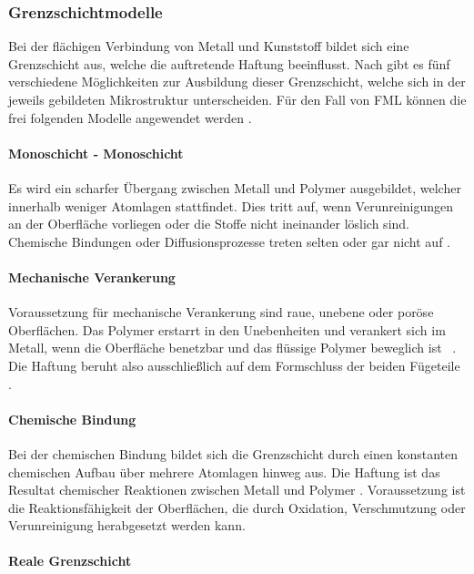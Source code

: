 \subsubsection{Grenzschichtmodelle}\label{sec:modelle}

Bei der flächigen Verbindung von Metall und Kunststoff bildet sich eine Grenzschicht aus, welche die auftretende Haftung beeinflusst.
Nach \cite{Haefer.1987} gibt es fünf verschiedene Möglichkeiten zur Ausbildung dieser Grenzschicht, welche sich in der jeweils gebildeten Mikrostruktur unterscheiden.
Für den Fall von FML können die frei folgenden Modelle angewendet werden \cite{Flock.2012}.

\paragraph{Monoschicht - Monoschicht}

Es wird ein scharfer Übergang zwischen Metall und Polymer ausgebildet, welcher innerhalb weniger Atomlagen stattfindet.
Dies tritt auf, wenn Verunreinigungen an der Oberfläche vorliegen oder die Stoffe nicht ineinander löslich sind.
Chemische Bindungen oder Diffusionsprozesse treten selten oder gar nicht auf \cite{Mann.1993,Haefer.1987}.

\paragraph{Mechanische Verankerung}

Voraussetzung für mechanische Verankerung sind raue, unebene oder poröse Oberflächen.
Das Polymer erstarrt in den Unebenheiten und verankert sich im Metall, wenn die Oberfläche benetzbar und das flüssige Polymer beweglich ist \cite{Haefer.1987}~.
Die Haftung beruht also ausschließlich auf dem Formschluss der beiden Fügeteile \cite{Flock.2012}.

\paragraph{Chemische Bindung}

Bei der chemischen Bindung bildet sich die Grenzschicht durch einen konstanten chemischen Aufbau über mehrere Atomlagen hinweg aus.
Die Haftung ist das Resultat chemischer Reaktionen zwischen Metall und Polymer \cite{Haefer.1987}.
Voraussetzung ist die Reaktionsfähigkeit der Oberflächen, die durch Oxidation, Verschmutzung oder Verunreinigung herabgesetzt werden kann.

\paragraph{Reale Grenzschicht}

